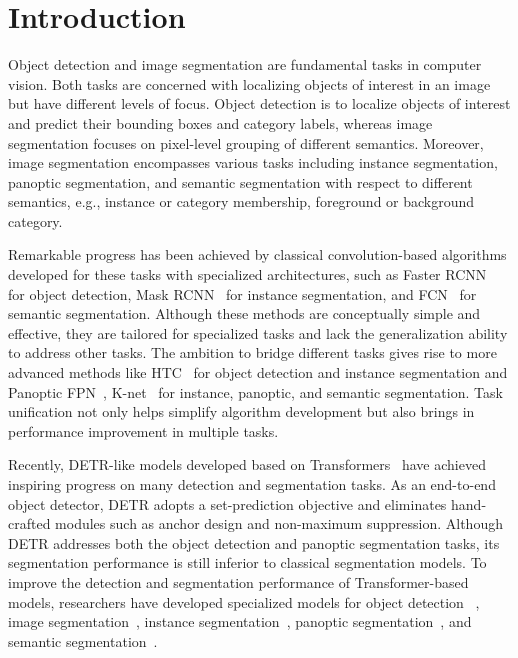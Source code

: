 \documentclass[10pt,twocolumn,letterpaper]{article}
\begin{document}
\section{Introduction}
Object detection and image segmentation are fundamental tasks in computer vision. Both tasks are concerned with localizing objects of interest in an image but have different levels of focus. Object detection is to localize objects of interest and predict their bounding boxes and category labels, whereas image segmentation focuses on pixel-level grouping of different semantics. Moreover, image segmentation encompasses various tasks including instance segmentation, panoptic segmentation, and semantic segmentation with respect to different semantics, e.g., instance or category membership, foreground or background category. 

Remarkable progress has been achieved by classical convolution-based algorithms developed for these tasks with specialized architectures, such as Faster RCNN~\cite{ren2015faster} for object detection, Mask RCNN~\cite{he2017mask} for instance segmentation, and FCN~\cite{long2015fully} for semantic segmentation. Although these methods are conceptually simple and effective, they are tailored for specialized tasks and lack the generalization ability to address other tasks. The ambition to bridge different tasks gives rise to more advanced methods like HTC~\cite{chen2019hybrid} for object detection and instance segmentation and Panoptic FPN~\cite{kirillov2019panoptic}, K-net~\cite{zhang2021k} for instance, panoptic, and semantic segmentation. 
Task unification not only helps simplify algorithm development but also brings in performance improvement in multiple tasks. 



Recently, DETR-like \cite{carion2020end} models developed based on Transformers~\cite{vaswani2017attention} have achieved inspiring progress on many detection and segmentation tasks.
As an end-to-end object detector, DETR adopts a set-prediction objective and eliminates hand-crafted modules such as anchor design and non-maximum suppression.
Although DETR addresses both the object detection and panoptic segmentation tasks, its segmentation performance is still inferior to classical segmentation models. To improve the detection and segmentation performance of Transformer-based models, researchers have developed specialized models for object detection ~\cite{zhu2020deformable,liu2022dab, li2022dn, zhang2022dino}, image segmentation~\cite{zhang2021k,cheng2021maskformer, cheng2021mask2former}, instance segmentation~\cite{fang2021instances}, panoptic segmentation~\cite{qin2022pyramid}, and semantic segmentation~\cite{jain2021semask}.
\end{document}
